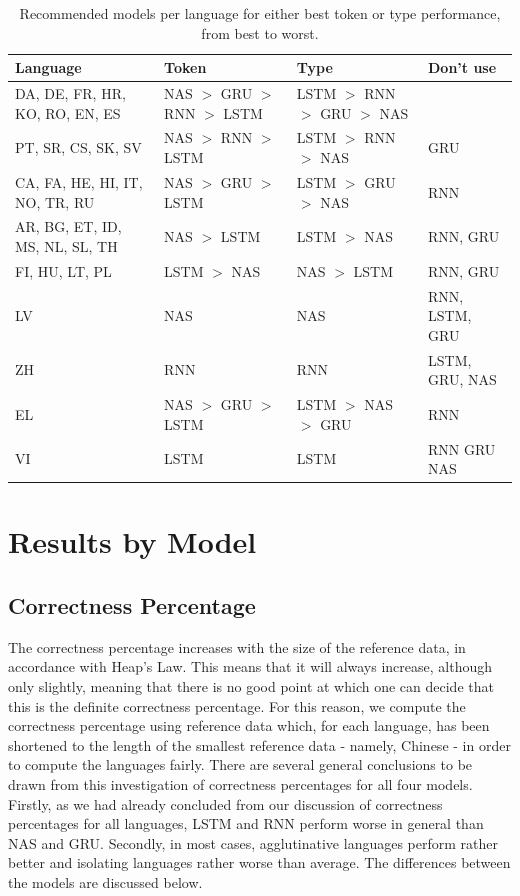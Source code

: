 \documentclass[11pt,a4paper,twoside,openright]{scrbook}
\begin{document}
\begin{table}[]
\centering
\caption{Recommended models per language for either best token or type performance, from best to worst.}
\label{table:laguage-wise-reccommendations}
\def\arraystretch{1.5}%
\begin{tabularx}{\textwidth}{XllX}
\textbf{Language}              & \textbf{Token}   & \textbf{Type}    & \textbf{Don't use} \\ \hline \hline
DA, DE, FR, HR, KO, RO, EN, ES & NAS $>$ GRU $>$ RNN $>$ LSTM & LSTM $>$ RNN $>$ GRU $>$ NAS &                    \\ \hline
PT, SR, CS, SK, SV             & NAS $>$ RNN $>$ LSTM     & LSTM $>$ RNN $>$ NAS     & GRU                \\ \hline
CA, FA, HE, HI, IT, NO, TR, RU & NAS $>$ GRU $>$ LSTM     & LSTM $>$ GRU $>$ NAS     & RNN                \\ \hline
AR, BG, ET, ID, MS, NL, SL, TH & NAS $>$ LSTM         & LSTM $>$ NAS         & RNN, GRU           \\ \hline
FI, HU, LT, PL                 & LSTM $>$ NAS         & NAS $>$ LSTM         & RNN, GRU           \\ \hline
LV                             & NAS              & NAS              & RNN, LSTM, GRU     \\ \hline
ZH                             & RNN              & RNN              & LSTM, GRU, NAS     \\ \hline
EL                             & NAS $>$ GRU $>$ LSTM     & LSTM $>$ NAS $>$ GRU     & RNN                \\ \hline
VI                             & LSTM             & LSTM             & RNN GRU NAS       
\end{tabularx}
\end{table}

\section{Results by Model}
\subsection{Correctness Percentage}
The correctness percentage increases with the size of the reference data, in accordance with Heap’s Law. This means that it will always increase, although only slightly, meaning that there is no good point at which one can decide that this is the definite correctness percentage. For this reason, we compute the correctness percentage using reference data which, for each language, has been shortened to the length of the smallest reference data - namely, Chinese - in order to compute the languages fairly.
There are several general conclusions to be drawn from this investigation of correctness percentages for all four models. Firstly, as we had already concluded from our discussion of correctness percentages for all languages, LSTM and RNN perform worse in general than NAS and GRU. Secondly, in most cases, agglutinative languages perform rather better and isolating languages rather worse than average. The differences between the models are discussed below. 
\end{document}
